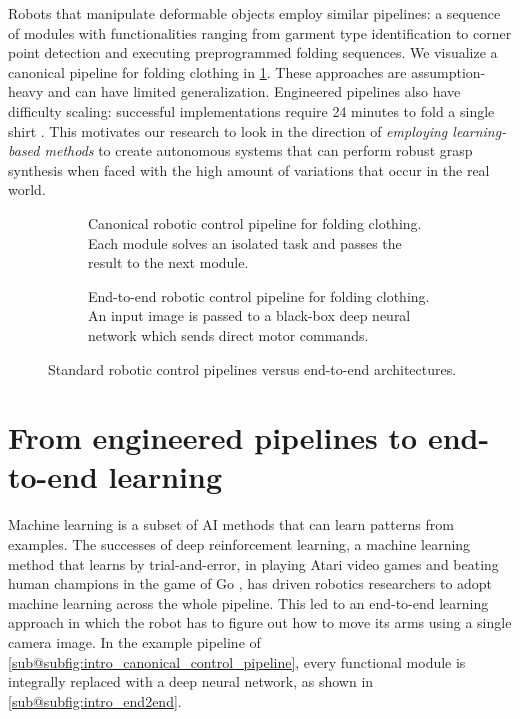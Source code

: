 \documentclass[\home/main.tex]{subfiles}
\begin{document}
Robots that manipulate deformable objects employ similar pipelines: a sequence of modules with functionalities ranging from garment type identification to corner point detection and executing preprogrammed folding sequences. We visualize a canonical pipeline for folding clothing in \cref{subfig:intro_canonical_control_pipeline}. These approaches are assumption-heavy and can have limited generalization. Engineered pipelines also have difficulty scaling: successful implementations require 24 minutes to fold a single shirt \autocite{Maitin2010}. This motivates our research to look in the direction of \emph{employing learning-based methods} to create autonomous systems that can perform robust grasp synthesis when faced with the high amount of variations that occur in the real world.

\begin{sidewaysfigure}
    \centering
    \begin{subfigure}[b]{1.0\textwidth}
        \centering
        
        \caption{Canonical robotic control pipeline for folding clothing. Each module solves an isolated task and passes the result to the next module.}
        \label{subfig:intro_canonical_control_pipeline}
    \end{subfigure}
    \par\bigskip %
    \begin{subfigure}[b]{1.0\textwidth}
        \centering
        
        \caption{End-to-end robotic control pipeline for folding clothing. An input image is passed to a black-box deep neural network which sends direct motor commands.}
        \label{subfig:intro_end2end}
    \end{subfigure}

    \caption[]{Standard robotic control pipelines versus end-to-end architectures.}
    \label{fig:intro_pipelines}
\end{sidewaysfigure}

\section{From engineered pipelines to end-to-end learning}
Machine learning is a subset of \gls{AI} methods that can learn patterns from examples. The successes of deep reinforcement learning, a machine learning method that learns by trial-and-error, in playing Atari video games \autocite{Mnih2015} and beating human champions in the game of Go \autocite{gaemofGo2016}, has driven robotics researchers to adopt machine learning across the whole pipeline. This led to an end-to-end learning approach in which the robot has to figure out how to move its arms using a single camera image. In the example pipeline of \cref{sub@subfig:intro_canonical_control_pipeline}, every functional module is integrally replaced with a deep neural network, as shown in \cref{sub@subfig:intro_end2end}.
\end{document}
